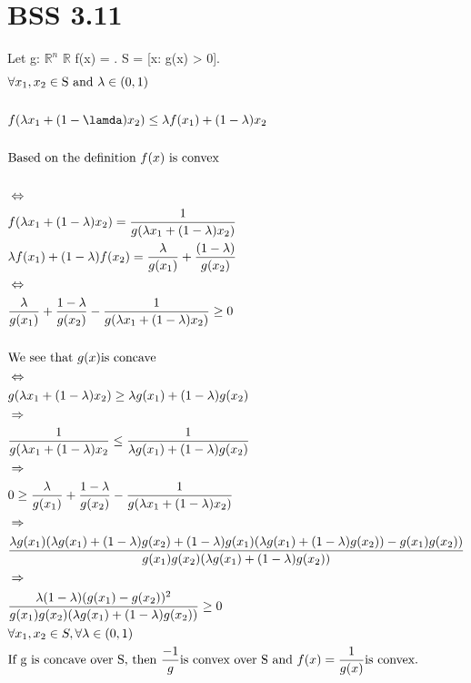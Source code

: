 \documentclass[12pt]{article}
\newcommand{\R}{\mathbb{R}}
\begin{document}
\section{BSS 3.11} 
Let g: $\R^n$ \longrightarrow $\R$  f(x) = .  S = [x: g(x) > 0]. \\

    \begin{align*}
        &\forall x_1, x_2 \in \text{S and } \lambda \in (0,1)\\ \\
        &f(\lambda x_1 + (1-\lamda) x_2) \leq \lambda f(x_1) + (1-\lambda) x_2\\ \\ 
        &\text{Based on the definition $f(x)$ is convex}\\ \\
        &\Leftrightarrow\\
        &f(\lambda x_1 + (1-\lambda)x_2) = \frac{1}{g(\lambda x_1 + (1-\lambda) x_2)}\\
        &\lambda f(x_1) + (1-\lambda) f(x_2) = \frac{\lambda}{g(x_1)} + \frac{(1-\lambda)}{g(x_2)}\\
        &\Leftrightarrow\\
        &\frac{\lambda}{g(x_1)} + \frac{1-\lambda}{g(x_2)} - \frac{1}{g(\lambda x_1 + (1-\lambda) x_2)} \geq 0 \\ \\
        &\text{We see that } g(x) \text{is concave} \\
        &\Leftrightarrow\\
        &g(\lambda x_1 + ( 1-\lambda)x_2) \geq \lambda g(x_1) + (1-\lambda) g(x_2) \\ 
        &\Rightarrow\\
        &\frac{1}{g(\lambda x_1 + (1-\lambda) x_2} \leq \frac{1}{\lambda g(x_1) + (1-\lambda) g(x_2)}\\
        &\Rightarrow\\
        &0 \geq \frac{\lambda}{g(x_1)} + \frac{1-\lambda}{g(x_2)} - \frac{1}{g(\lambda x_1 + (1-\lambda) x_2)}\\
        &\Rightarrow\\
        &\frac{\lambda g(x_1) (\lambda g(x_1) + (1-\lambda) g(x_2) + (1-\lambda) g(x_1) (\lambda g(x_1) + (1-\lambda) g(x_2)) - g(x_1)g(x_2))}{g(x_1)g(x_2) (\lambda g(x_1) + (1-\lambda) g(x_2))}\\
        &\Rightarrow\\
        &\frac{\lambda (1-\lambda)(g(x_1)-g(x_2))^2}{g(x_1)g(x_2)(\lambda g(x_1) + (1-\lambda) g(x_2))} \geq 0\\
        &\forall x_1, x_2 \in S, \forall \lambda \in (0,1)\\
        &\text{If g is concave over S, then } \frac{-1}{g} \text{is convex over S and } f(x) = \frac{1}{g(x)} \text{is convex}.
    \end{align*}\\
\end{document}
